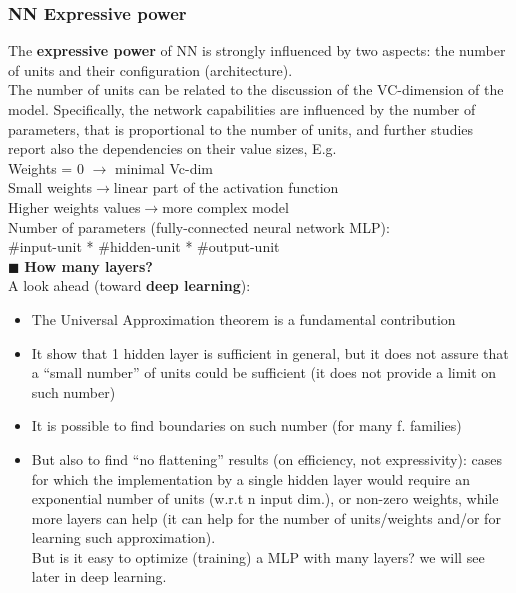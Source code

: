 \documentclass[../main.tex]{subfiles}
\begin{document}
\subsubsection{NN Expressive power}
The \textbf{expressive power} of NN is strongly influenced by two aspects: the number of units and their configuration (architecture).\\

The number of units can be related to the discussion of the VC-dimension of the model.
Specifically, the network capabilities are influenced by the number of parameters, that is proportional to the number of units,
and further studies report also the dependencies on their value sizes, E.g.\\

\noindent Weights = 0 $\rightarrow$ minimal Vc-dim\\
Small weights$\rightarrow$linear part of the activation function\\
Higher weights values$\rightarrow$more complex model\\

\noindent Number of parameters (fully-connected neural network MLP):\\
 \#input-unit * \#hidden-unit * \#output-unit\\

\noindent$\blacksquare$ \textbf{How many layers?}\\
A look ahead (toward \textbf{deep learning}):
\begin{itemize}
    \item The Universal Approximation theorem is a fundamental contribution
    \item It show that 1 hidden layer is sufficient in general, but it does not assure that a “small number” of units could be sufficient (it does not provide a limit on such number)
    \item It is possible to find boundaries on such number (for many f. families)
    \item But also to find “no flattening” results (on efficiency, not expressivity):
    cases for which the implementation by a single hidden layer would require an exponential number of units (w.r.t n input dim.), or non-zero weights, while more layers can help (it can help for the number of units/weights and/or for learning such approximation).\\
    But is it easy to optimize (training) a MLP with many layers? we will see later in deep learning.
\end{itemize}
\newpage
\end{document}

